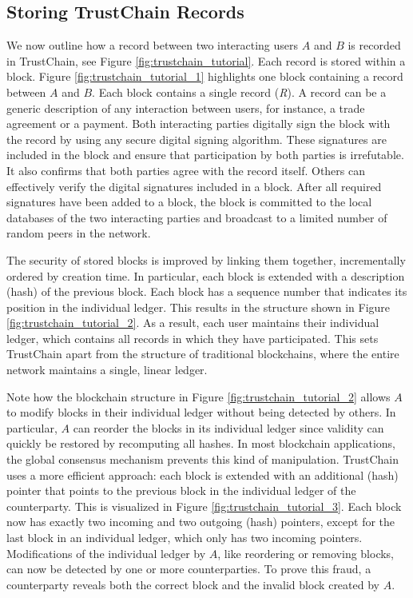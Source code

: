\subsection{Storing TrustChain Records}
We now outline how a record between two interacting users $ A $ and $ B $ is recorded in TrustChain, see Figure \ref{fig:trustchain_tutorial}.
Each record is stored within a block.
Figure \ref{fig:trustchain_tutorial_1} highlights one block containing a record between $ A $ and $ B $.
Each block contains a single record (\emph{R}).
A record can be a generic description of any interaction between users, for instance, a trade agreement or a payment.
Both interacting parties digitally sign the block with the record by using any secure digital signing algorithm.
These signatures are included in the block and ensure that participation by both parties is irrefutable.
It also confirms that both parties agree with the record itself.
Others can effectively verify the digital signatures included in a block.
After all required signatures have been added to a block, the block is committed to the local databases of the two interacting parties and broadcast to a limited number of random peers in the network.

The security of stored blocks is improved by linking them together, incrementally ordered by creation time.
In particular, each block is extended with a description (hash) of the previous block.
Each block has a sequence number that indicates its position in the individual ledger.
This results in the structure shown in Figure \ref{fig:trustchain_tutorial_2}.
As a result, each user maintains their individual ledger, which contains all records in which they have participated.
This sets TrustChain apart from the structure of traditional blockchains, where the entire network maintains a single, linear ledger.

Note how the blockchain structure in Figure \ref{fig:trustchain_tutorial_2} allows $ A $ to modify blocks in their individual ledger without being detected by others.
In particular, $ A $ can reorder the blocks in its individual ledger since validity can quickly be restored by recomputing all hashes.
In most blockchain applications, the global consensus mechanism prevents this kind of manipulation.
TrustChain uses a more efficient approach: each block is extended with an additional (hash) pointer that points to the previous block in the individual ledger of the counterparty.
This is visualized in Figure \ref{fig:trustchain_tutorial_3}.
Each block now has exactly two incoming and two outgoing (hash) pointers, except for the last block in an individual ledger, which only has two incoming pointers.
Modifications of the individual ledger by $ A $, like reordering or removing blocks, can now be detected by one or more counterparties.
To prove this fraud, a counterparty reveals both the correct block and the invalid block created by $ A $.

